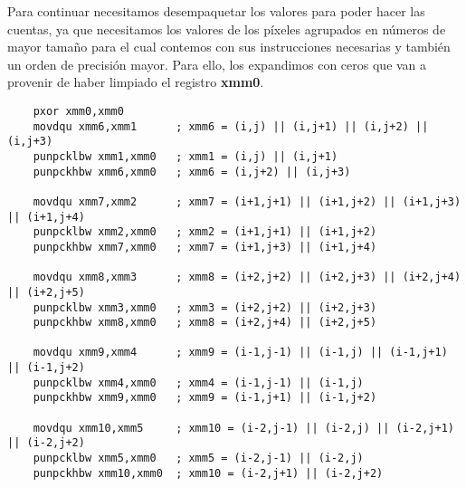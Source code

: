 \documentclass[a4paper]{article}
\begin{document}
\indent Para continuar necesitamos desempaquetar los valores para poder hacer las cuentas, ya que necesitamos los valores de los p\'ixeles agrupados en n\'umeros de mayor tama\~no para el cual contemos con sus instrucciones necesarias y tambi\'en un orden de precisi\'on mayor. Para ello, los expandimos con ceros que van a provenir de haber limpiado el registro \textbf{xmm0}.

 \begin{codesnippet}
\begin{verbatim}
    pxor xmm0,xmm0
    movdqu xmm6,xmm1      ; xmm6 = (i,j) || (i,j+1) || (i,j+2) || (i,j+3)
    punpcklbw xmm1,xmm0   ; xmm1 = (i,j) || (i,j+1)
    punpckhbw xmm6,xmm0   ; xmm6 = (i,j+2) || (i,j+3)

    movdqu xmm7,xmm2      ; xmm7 = (i+1,j+1) || (i+1,j+2) || (i+1,j+3) || (i+1,j+4)
    punpcklbw xmm2,xmm0   ; xmm2 = (i+1,j+1) || (i+1,j+2)
    punpckhbw xmm7,xmm0   ; xmm7 = (i+1,j+3) || (i+1,j+4)

    movdqu xmm8,xmm3      ; xmm8 = (i+2,j+2) || (i+2,j+3) || (i+2,j+4) || (i+2,j+5)
    punpcklbw xmm3,xmm0   ; xmm3 = (i+2,j+2) || (i+2,j+3)
    punpckhbw xmm8,xmm0   ; xmm8 = (i+2,j+4) || (i+2,j+5)

    movdqu xmm9,xmm4      ; xmm9 = (i-1,j-1) || (i-1,j) || (i-1,j+1) || (i-1,j+2)
    punpcklbw xmm4,xmm0   ; xmm4 = (i-1,j-1) || (i-1,j)
    punpckhbw xmm9,xmm0   ; xmm9 = (i-1,j+1) || (i-1,j+2)

    movdqu xmm10,xmm5     ; xmm10 = (i-2,j-1) || (i-2,j) || (i-2,j+1) || (i-2,j+2)
    punpcklbw xmm5,xmm0   ; xmm5 = (i-2,j-1) || (i-2,j)
    punpckhbw xmm10,xmm0  ; xmm10 = (i-2,j+1) || (i-2,j+2)
\end{verbatim}
\end{codesnippet}
\newpage
\end{document}
